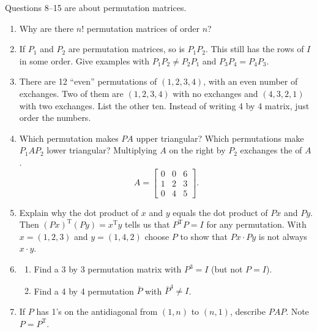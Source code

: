 \documentclass[14pt, a4paper]{article}
\begin{document}
\noindent Questions 8--15 are about permutation matrices.
\begin{enumerate}[resume]
    \item Why are there $n!$ permutation matrices of order $n$?

    \item If $P_1$ and $P_2$ are permutation matrices, so is $P_1P_2$. This still has the rows of $I$ in some order. Give examples with $P_1P_2 \ne P_2P_1$ and $P_3P_4 = P_4P_3$.

    \item There are 12 ``even'' permutations of $(1,2,3,4)$, with an even number of exchanges. Two of them are $(1,2,3,4)$ with no exchanges and $(4,3,2,1)$ with two exchanges. List the other ten. Instead of writing 4 by 4 matrix, just order the numbers.

    \item Which permutation makes $PA$ upper triangular? Which permutations make $P_1AP_2$ lower triangular? Multiplying $A$ on the right by $P_2$ exchanges the \underline{\hspace{2cm}} of $A$.
          \[
              A = \begin{bmatrix}0 & 0 & 6 \\ 1 & 2 & 3 \\ 0 & 4 & 5\end{bmatrix}.
          \]

    \item Explain why the dot product of $x$ and $y$ equals the dot product of $Px$ and $Py$. Then $(Px)^{\mathrm{T}}(Py) = x^{\mathrm{T}}y$ tells us that $P^{\mathrm{T}}P = I$ for any permutation. With $x = (1,2,3)$ and $y = (1,4,2)$ choose $P$ to show that $Px \cdot Py$ is not always $x \cdot y$.

    \item
          \begin{enumerate}
              \item Find a 3 by 3 permutation matrix with $P^3 = I$ (but not $P = I$).
              \item Find a 4 by 4 permutation $\bar{P}$ with $\bar{P}^4 \ne I$.
          \end{enumerate}

    \item If $P$ has 1's on the antidiagonal from $(1,n)$ to $(n,1)$, describe $PAP$. Note $P = P^{\mathrm{T}}$.


\end{enumerate}
\end{document}
